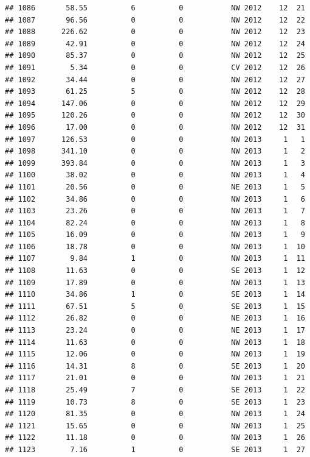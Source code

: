 \documentclass[
]{article}
\begin{document}
\begin{verbatim}
## 1086       58.55          6          0           NW 2012    12  21
## 1087       96.56          0          0           NW 2012    12  22
## 1088      226.62          0          0           NW 2012    12  23
## 1089       42.91          0          0           NW 2012    12  24
## 1090       85.37          0          0           NW 2012    12  25
## 1091        5.34          0          0           CV 2012    12  26
## 1092       34.44          0          0           NW 2012    12  27
## 1093       61.25          5          0           NW 2012    12  28
## 1094      147.06          0          0           NW 2012    12  29
## 1095      120.26          0          0           NW 2012    12  30
## 1096       17.00          0          0           NW 2012    12  31
## 1097      126.53          0          0           NW 2013     1   1
## 1098      341.10          0          0           NW 2013     1   2
## 1099      393.84          0          0           NW 2013     1   3
## 1100       38.02          0          0           NW 2013     1   4
## 1101       20.56          0          0           NE 2013     1   5
## 1102       34.86          0          0           NW 2013     1   6
## 1103       23.26          0          0           NW 2013     1   7
## 1104       82.24          0          0           NW 2013     1   8
## 1105       16.09          0          0           NW 2013     1   9
## 1106       18.78          0          0           NW 2013     1  10
## 1107        9.84          1          0           NW 2013     1  11
## 1108       11.63          0          0           SE 2013     1  12
## 1109       17.89          0          0           NW 2013     1  13
## 1110       34.86          1          0           SE 2013     1  14
## 1111       67.51          5          0           SE 2013     1  15
## 1112       26.82          0          0           NE 2013     1  16
## 1113       23.24          0          0           NE 2013     1  17
## 1114       11.63          0          0           NW 2013     1  18
## 1115       12.06          0          0           NW 2013     1  19
## 1116       14.31          8          0           SE 2013     1  20
## 1117       21.01          0          0           NW 2013     1  21
## 1118       25.49          7          0           SE 2013     1  22
## 1119       10.73          8          0           SE 2013     1  23
## 1120       81.35          0          0           NW 2013     1  24
## 1121       15.65          0          0           NW 2013     1  25
## 1122       11.18          0          0           NW 2013     1  26
## 1123        7.16          1          0           SE 2013     1  27

\end{verbatim}
\end{document}
